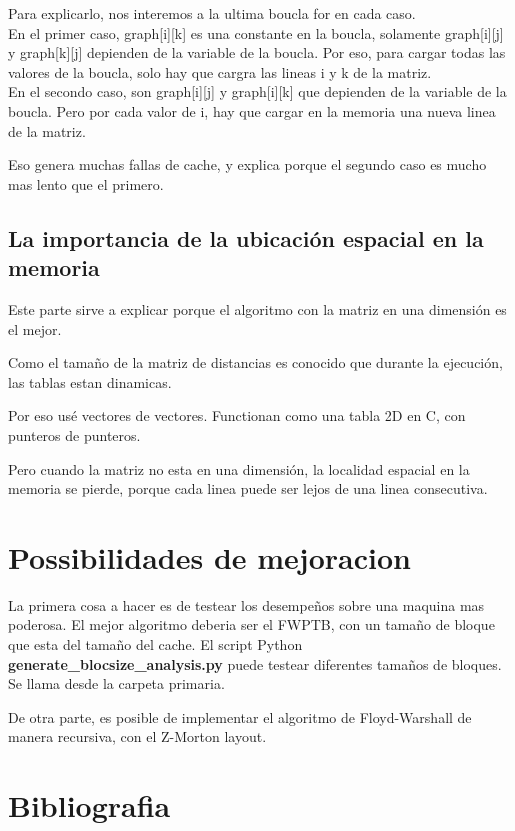 \documentclass[a4paper,11pt]{article}
\begin{document}
Para explicarlo, nos interemos a la ultima boucla for en cada caso.\\

En el primer caso, graph[i][k] es una constante en la boucla, solamente graph[i][j] y graph[k][j] depienden de la variable de la boucla. Por eso, para cargar todas las valores de la boucla, solo hay que cargra las lineas i y k de la matriz.\\

En el secondo caso, son graph[i][j] y graph[i][k] que depienden de la variable de la boucla. Pero por cada valor de i, hay que cargar en la memoria una nueva linea de la matriz.

\noindent Eso genera muchas fallas de cache, y explica porque el segundo caso es mucho mas lento que el primero.

\subsection{La importancia de la ubicación espacial en la memoria}

Este parte sirve a explicar porque el algoritmo con la matriz en una dimensión es el mejor.

Como el tamaño de la matriz de distancias es conocido que durante la ejecución, las tablas estan dinamicas.

Por eso usé vectores de vectores. Functionan como una tabla 2D en C, con punteros de punteros.

Pero cuando la matriz no esta en una dimensión, la localidad espacial en la memoria se pierde, porque cada linea puede ser lejos de una linea consecutiva.

\section{Possibilidades de mejoracion}

La primera cosa a hacer es de testear los desempeños sobre una maquina mas poderosa. El mejor algoritmo deberia ser el FWPTB, con un tamaño de bloque que esta del tamaño del cache. El script Python \textbf{generate\_blocsize\_analysis.py} puede testear diferentes tamaños de bloques. Se llama desde la carpeta primaria.

De otra parte, es posible de implementar el algoritmo de Floyd-Warshall de manera recursiva, con el Z-Morton layout.

\section{Bibliografia}
\end{document}
